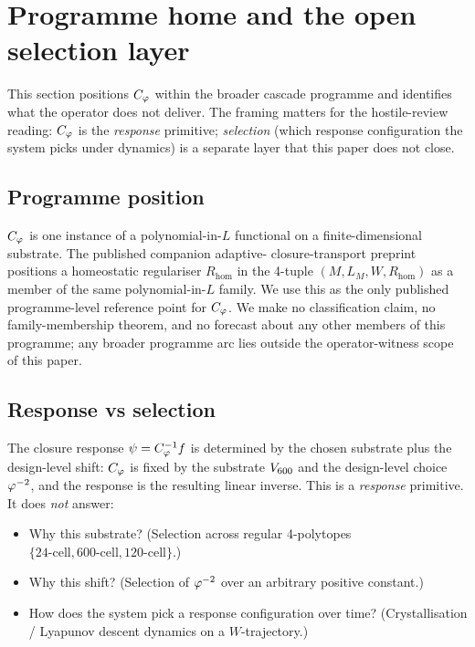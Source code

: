 \section{Programme home and the open selection layer}\label{sec:programme_home}

This section positions $C_{\varphi}$ within the broader cascade programme
and identifies what the operator does not deliver. The framing
matters for the hostile-review reading: $C_{\varphi}$ is the
\emph{response} primitive; \emph{selection} (which response
configuration the system picks under dynamics) is a separate layer
that this paper does not close.

\subsection{Programme position}

$C_{\varphi}$ is one instance of a polynomial-in-$L$ functional on a
finite-dimensional substrate. The published companion adaptive-
closure-transport
preprint~\citep{SmartAdaptiveClosureTransport2026} positions a
homeostatic regulariser $R_{\mathrm{hom}}$ in the 4-tuple
$(M, L_M, W, R_{\mathrm{hom}})$ as a member of the same
polynomial-in-$L$ family. We use this as the only published
programme-level reference point for $C_{\varphi}$. We make no
classification claim, no family-membership theorem, and no
forecast about any other members of this programme; any
broader programme arc lies outside the operator-witness scope of
this paper.

\subsection{Response vs selection}

The closure response $\psi = C_{\varphi}^{-1} f$ is determined by the
chosen substrate plus the design-level shift: $C_{\varphi}$ is fixed by
the substrate $V_{600}$ and the design-level choice
$\varphi^{-2}$, and the response is the resulting linear inverse.
This is a \emph{response} primitive. It does \emph{not} answer:
\begin{itemize}\itemsep=2pt
\item Why this substrate? (Selection across regular 4-polytopes
  $\{24\text{-cell}, 600\text{-cell}, 120\text{-cell}\}$.)
\item Why this shift? (Selection of $\varphi^{-2}$ over an arbitrary
  positive constant.)
\item How does the system pick a response configuration over
  time? (Crystallisation / Lyapunov descent dynamics on a
  $W$-trajectory.)
\end{itemize}

